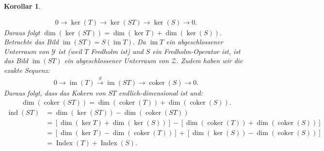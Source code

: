 \documentclass[11pt, hidelinks]{article}
\numberwithin{conj}{section}
\newtheorem{corollary}[conj]{Korollar}
\begin{document}
\begin{corollary}
\begin{enumerate}
   \begin{align}
     0 \to \ker(T) \to \ker(S T) \to \ker(S) \to 0.
   \end{align}
     Daraus folgt $\dim(\ker(S T)) = \dim(\ker T) + \dim(\ker(S))$. Betrachte das Bild \( \operatorname{im}(S T) = S(\operatorname{im} T) \). Da \( \operatorname{im} T \) ein abgeschlossener Unterraum von \( \mathcal{Y} \) ist (weil \( T \) Fredholm ist) und \( S \) ein Fredholm-Operator ist, ist das Bild \( \operatorname{im}(S T) \) ein abgeschlossener Unterraum von \( \mathcal{Z} \). Zudem haben wir die exakte Sequenz:
   \begin{align}
     0 \to \operatorname{im}(T) \xrightarrow{S} \operatorname{im}(S T) \to \operatorname{coker}(S) \to 0.
   \end{align}
     Daraus folgt, dass das Kokern von \( S T \) endlich-dimensional ist und:
   \begin{align}
     \dim(\operatorname{coker}(S T)) = \dim(\operatorname{coker}(T)) + \dim(\operatorname{coker}(S)).
   \end{align}
   \begin{align}
   \operatorname{ind}(S T) &= \dim(\ker(S T)) - \dim(\operatorname{coker}(S T)) \nonumber\\
   &= [\dim(\ker T) + \dim(\ker(S))] - [\dim(\operatorname{coker}(T)) + \dim(\operatorname{coker}(S))] \nonumber\\
   &= [\dim(\ker T) - \dim(\operatorname{coker}(T))] + [\dim(\ker(S)) - \dim(\operatorname{coker}(S))] \nonumber\\
   &= \operatorname{Index}(T) + \operatorname{Index}(S).
   \end{align}
    \end{enumerate}
\end{corollary}
\end{document}
